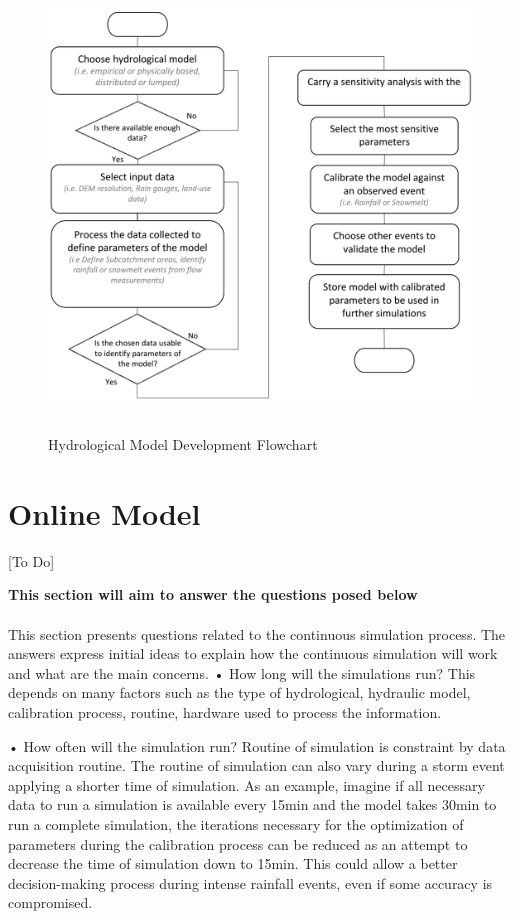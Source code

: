 \begin{figure}[h]
    \centering
	\includegraphics[height=12cm]{figures/Offline_Model_Creation_Flow_Chart.png}
	\caption{Hydrological Model Development Flowchart}
	\label{fig:offlineflow}
\end{figure}



\section{Online Model}

[To Do]

\textbf{This section will aim to answer the questions posed below} \\ \\

This section presents questions related to the continuous simulation process. The answers express initial ideas to explain how the continuous simulation will work and what are the main concerns. 
•	How long will the simulations run? This depends on many factors such as the type of hydrological, hydraulic model, calibration process, routine, hardware used to process the information. 

•	How often will the simulation run? Routine of simulation is constraint by data acquisition routine.  The routine of simulation can also vary during a storm event applying a shorter time of simulation. As an example, imagine if all necessary data to run a simulation is available every 15min and the model takes 30min to run a complete simulation, the iterations necessary for the optimization of parameters during the calibration process can be reduced as an attempt to decrease the time of simulation down to 15min. This could allow a better decision-making process during intense rainfall events, even if some accuracy is compromised.

